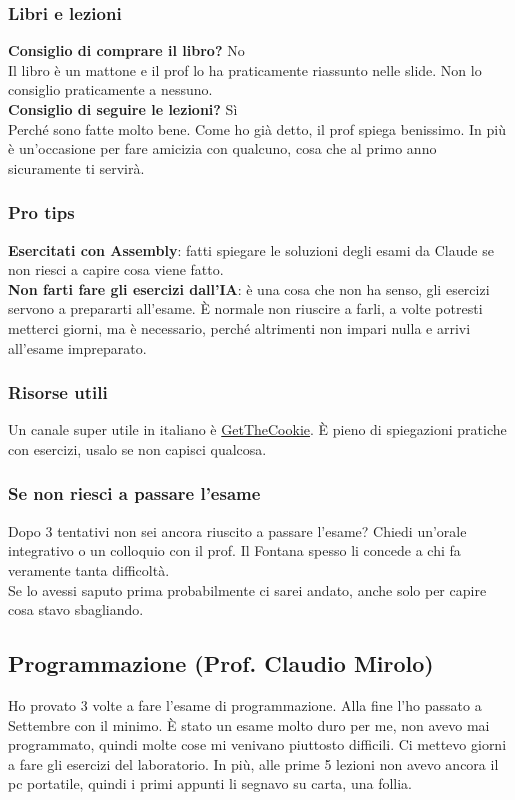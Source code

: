 \documentclass[18pt]{extarticle}
\begin{document}
\subsubsection{Libri e lezioni}
\textbf{Consiglio di comprare il libro?} No\\
Il libro è un mattone e il prof lo ha praticamente riassunto nelle slide. Non lo consiglio praticamente a nessuno.\\
\textbf{Consiglio di seguire le lezioni?} Sì\\
Perché sono fatte molto bene. Come ho già detto, il prof spiega benissimo. In più è un'occasione per fare amicizia con qualcuno, cosa che al primo anno sicuramente ti servirà.\\

\subsubsection{Pro tips}
\textbf{Esercitati con Assembly}: fatti spiegare le soluzioni degli esami da Claude se non riesci a capire cosa viene fatto.\\
\textbf{Non farti fare gli esercizi dall'IA}: è una cosa che non ha senso, gli esercizi servono a prepararti all'esame. È normale non riuscire a farli, a volte potresti metterci giorni, ma è necessario, perché altrimenti non impari nulla e arrivi all'esame impreparato. 

\subsubsection{Risorse utili}
Un canale super utile in italiano è \href{https://www.youtube.com/@GetTheCookie}{GetTheCookie}. È pieno di spiegazioni pratiche con esercizi, usalo se non capisci qualcosa.

\subsubsection{Se non riesci a passare l'esame}
Dopo 3 tentativi non sei ancora riuscito a passare l'esame? Chiedi un'orale integrativo o un colloquio con il prof. Il Fontana spesso li concede a chi fa veramente tanta difficoltà.\\
Se lo avessi saputo prima probabilmente ci sarei andato, anche solo per capire cosa stavo sbagliando.


\clearpage

\subsection{Programmazione (Prof. Claudio Mirolo)}
Ho provato 3 volte a fare l'esame di programmazione. Alla fine l'ho passato a Settembre con il minimo. È stato un esame molto duro per me, non avevo mai programmato, quindi molte cose mi venivano piuttosto difficili. Ci mettevo giorni a fare gli esercizi del laboratorio. 
In più, alle prime 5 lezioni non avevo ancora il pc portatile, quindi i primi appunti li segnavo su carta, una follia.
\end{document}
